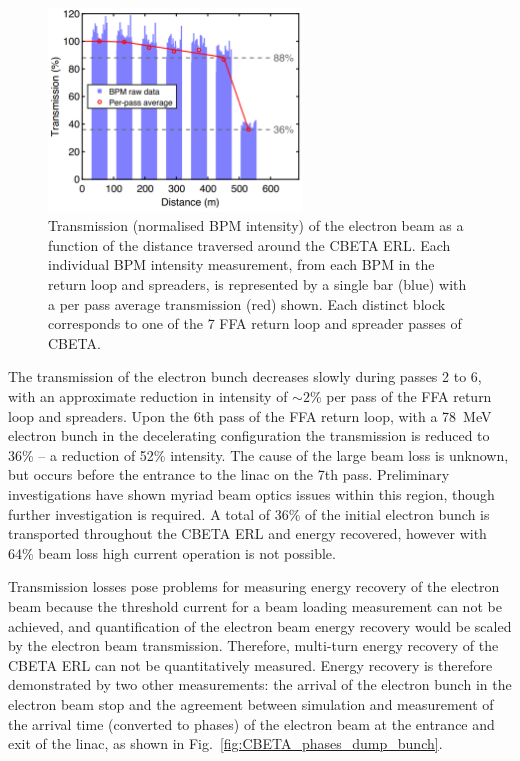 \documentclass[../main.tex]{subfiles}
\begin{document}
\begin{figure}[!h]
\centering
\includegraphics[width=0.6\textwidth]{Figures/CBETA_Multi-Pass_Commissioning/transmission.pdf}
\caption{Transmission (normalised BPM intensity) of the electron beam as a function of the distance traversed around the CBETA ERL.  Each individual BPM intensity measurement, from each BPM in the return loop and spreaders, is represented by a single bar (blue) with a per pass average transmission (red) shown. Each distinct block corresponds to one of the 7 FFA return loop and spreader passes of CBETA.}
\label{fig:CBETA_transmission}
\end{figure}

The transmission of the electron bunch decreases slowly during passes 2 to 6, with an approximate reduction in intensity of $\sim 2$\% per pass of the FFA return loop and spreaders. Upon the 6th pass of the FFA return loop, with a 78~\si{\mega\electronvolt} electron bunch in the decelerating configuration the transmission is reduced to 36\% -- a reduction of 52\% intensity. The cause of the large beam loss is unknown, but occurs before the entrance to the linac on the 7th pass. Preliminary investigations have shown myriad beam optics issues within this region, though further investigation is required. A total of 36\% of the initial electron bunch is transported throughout the CBETA ERL and energy recovered, however with 64\% beam loss high current operation is not possible.

Transmission losses pose problems for measuring energy recovery of the electron beam because the threshold current for a beam loading measurement can not be achieved, and quantification of the electron beam energy recovery would be scaled by the electron beam transmission. Therefore, multi-turn energy recovery of the CBETA ERL can not be quantitatively measured. Energy recovery is therefore demonstrated by two other measurements: the arrival of the electron bunch in the electron beam stop and the agreement between simulation and measurement of the arrival time (converted to phases) of the electron beam at the entrance and exit of the linac, as shown in Fig.~\ref{fig:CBETA_phases_dump_bunch}.    
\end{document}
